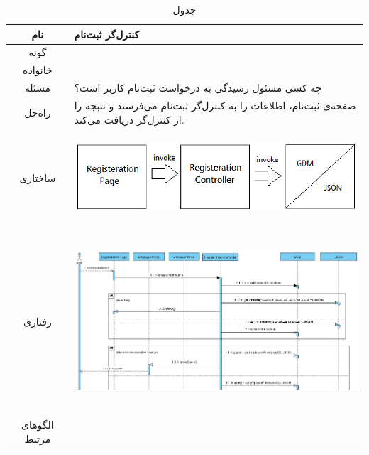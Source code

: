 \begin{table}[H]
	\begin{adjustbox}{width=\textwidth}
		\begin{tabular}{|c|p{\textwidth}|}
			\hline
			نام &
			کنترل‌گر ثبت‌نام \\ 
			\hline
			گونه & 
			\grasp \\
			\hline
			خانواده &
			\controller \\
			\hline
			مسئله & 
			چه کسی مسئول رسیدگی به درخواست ثبت‌نام کاربر است؟\\
			\hline
			راه‌حل& 
			صفحه‌ی ثبت‌نام، اطلاعات را به کنترل‌گر ثبت‌‌نام می‌فرستد و نتبجه‌ را از کنترل‌گر دریافت می‌کند. \\
			\hline
			ساختاری & 
			\begin{minipage}{\textwidth}
				\begin{flushleft}
					\begin{minipage}{\textwidth}
						\includegraphics[width=13cm, height=2.7cm]{./images/7-7-1}
					\end{minipage}
				\end{flushleft}
			\end{minipage}
			
			\\
			\hline
			رفتاری & 
			\begin{minipage}{\textwidth}
				\begin{flushleft}
					\begin{minipage}{\textwidth}
						\includegraphics[width=13.5cm, height=6cm]{./images/7-7-2}
					\end{minipage}
				\end{flushleft}
			\end{minipage}
			\\
			\hline
			الگو‌های مرتبط& \\
			\hline
		\end{tabular}
	\end{adjustbox}
	\caption{جدول }
	\label{table-with-pic:7}
\end{table}
